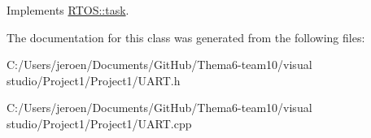 Implements \hyperlink{class_r_t_o_s_1_1task_addc6d52f8792ddba1158d7ae5ef0037d}{R\+T\+O\+S\+::task}.



The documentation for this class was generated from the following files\+:\begin{DoxyCompactItemize}
\item 
C\+:/\+Users/jeroen/\+Documents/\+Git\+Hub/\+Thema6-\/team10/visual studio/\+Project1/\+Project1/U\+A\+R\+T.\+h\item 
C\+:/\+Users/jeroen/\+Documents/\+Git\+Hub/\+Thema6-\/team10/visual studio/\+Project1/\+Project1/U\+A\+R\+T.\+cpp\end{DoxyCompactItemize}
